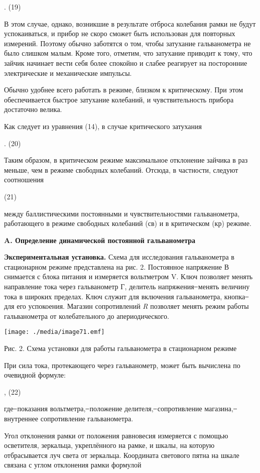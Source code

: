 \documentclass[]{article}
\begin{document}
. (19)

В этом случае, однако, возникшие в результате отброса колебания рамки не
будут успокаиваться, и прибор не скоро сможет быть использован для
повторных измерений. Поэтому обычно заботятся о том, чтобы затухание
гальванометра не было слишком малым. Кроме того, отметим, что затухание
приводит к тому, что зайчик начинает вести себя более спокойно и слабее
реагирует на посторонние электрические и механические импульсы.

Обычно удобнее всего работать в режиме, близком к критическому. При этом
обеспечивается быстрое затухание колебаний, и чувствительность прибора
достаточно велика.

Как следует из уравнения (14), в случае критического затухания

. (20)

Таким образом, в критическом режиме максимальное отклонение зайчика в
раз меньше, чем в режиме свободных колебаний. Отсюда, в частности,
следуют соотношения

(21)

между баллистическими постоянными и чувствительностями гальванометра,
работающего в режиме свободных колебаний (св) и в критическом (кр)
режиме.

\textbf{A. Определение динамической постоянной гальванометра}

\textbf{Экспериментальная установка.} Схема для исследования
гальванометра в стационарном режиме представлена на рис. 2. Постоянное
напряжение В снимается с блока питания и измеряется вольтметром V. Ключ
позволяет менять направление тока через гальванометр Г, делитель
напряжения ̶ менять величину тока в широких пределах. Ключ служит для
включения гальванометра, кнопка ̶ для его успокоения. Магазин
сопротивлений \emph{R} позволяет менять режим работы гальванометра от
колебательного до апериодического.

\texttt{[image: ./media/image71.emf]}

Рис. 2. Схема установки для работы гальванометра в стационарном режиме

При сила тока, протекающего через гальванометр, может быть вычислена по
очевидной формуле:

, (22)

где ̶ показания вольтметра, ̶ положение делителя, ̶ сопротивление магазина,
̶ внутреннее сопротивление гальванометра.

Угол отклонения рамки от положения равновесия измеряется с помощью
осветителя, зеркальца, укреплённого на рамке, и шкалы, на которую
отбрасывается луч света от зеркальца. Координата светового пятна на
шкале связана с углом отклонения рамки формулой
\end{document}
